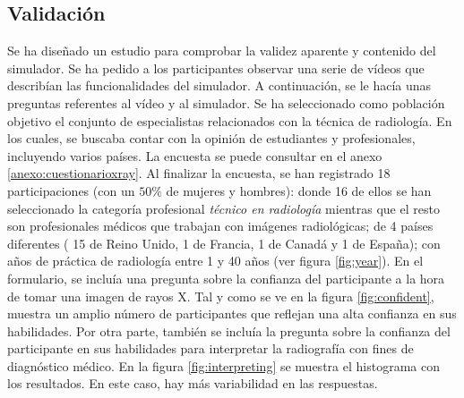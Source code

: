 \subsection{Validación}
\label{xray:validacion}
Se ha diseñado un estudio para comprobar la validez aparente y contenido del simulador. Se ha pedido a los participantes observar una serie de vídeos que describían las funcionalidades del simulador. A continuación, se le hacía unas preguntas referentes al vídeo y al simulador. Se ha seleccionado como  población objetivo el conjunto de especialistas relacionados con la técnica de radiología. En los cuales, se buscaba contar con la opinión de estudiantes y profesionales, incluyendo varios países. La encuesta se puede consultar en el anexo \ref{anexo:cuestionarioxray}.
%
Al finalizar la encuesta, se han registrado 18 participaciones (con un $50\%$ de mujeres y hombres): donde 16 de ellos se han seleccionado la categoría profesional \emph{técnico en radiología} mientras que el resto son profesionales médicos que trabajan con imágenes radiológicas; de 4 países diferentes ( 15 de Reino Unido, 1 de Francia, 1 de Canadá y 1 de España); con años de práctica de radiología entre 1 y 40 años (ver figura \ref{fig:year}).
%
En el formulario, se incluía una pregunta sobre la confianza del participante a la hora de tomar una imagen de rayos X. Tal y como se ve en la figura \ref{fig:confident}, muestra un amplio número de participantes que reflejan una alta confianza en sus habilidades.
%
Por otra parte, también se incluía la pregunta sobre la confianza del participante en sus habilidades para interpretar la radiografía con fines de diagnóstico médico. En la figura \ref{fig:interpreting} se muestra el histograma con los resultados. En este caso, hay más variabilidad en las respuestas.


